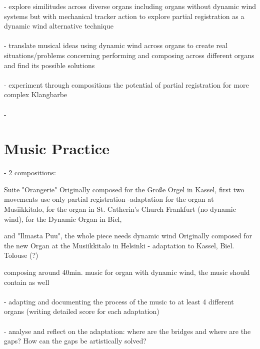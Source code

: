 \documentclass[11pt, oneside]{report}   	%
\begin{document}
- explore similitudes across diverse organs including organs without dynamic wind systems but with mechanical tracker action to explore partial registration as a dynamic wind alternative technique\\
\\
- translate musical ideas using dynamic wind across organs to create real situations/problems concerning performing and composing across different organs and find its possible solutions\\
\\
- experiment through compositions the potential of partial registration for more complex Klangbarbe\\
\\
- 
\section{Music Practice}

- 2 compositions: 

Suite "Orangerie" 
Originally composed for the Große Orgel in Kassel, first two movements use only partial registration
-adaptation for the organ at Musiikkitalo, for the organ in St. Catherin's Church Frankfurt (no dynamic wind), for the Dynamic Organ in Biel, 

and "Ilmasta Puu", the whole piece needs dynamic wind
Originally composed for the new Organ at the Musiikkitalo in Helsinki
- adaptation to Kassel, Biel. Tolouse (?)

composing around 40min. music for organ with dynamic wind, the music should contain as well \\
\\
- adapting and documenting the process of the music to at least 4 different organs (writing detailed score for each adaptation)\\
\\
- analyse and reflect on the adaptation: where are the bridges and where are the gaps? How can the gaps be artistically solved?
\end{document}
